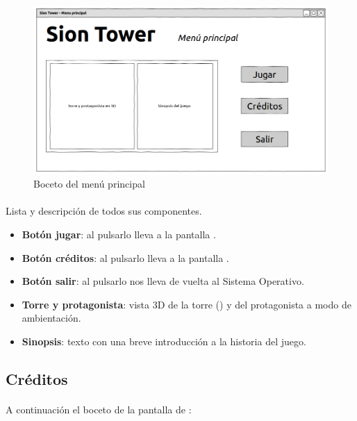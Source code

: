 \begin{figure}[H]
    \centering
        \includegraphics[width=\textwidth]{img/menu-principal.png} 
    \caption{Boceto del menú principal}
    \label{img:menu-principal}
\end{figure}

\paragraph{}
Lista y descripción de todos sus componentes.

\begin{itemize}
    \item \textbf{Botón jugar}: al pulsarlo lleva a la pantalla \selperfil.
    \item \textbf{Botón créditos}: al pulsarlo lleva a la pantalla \creditos.
    \item \textbf{Botón salir}: al pulsarlo nos lleva de vuelta al Sistema Operativo.
    \item \textbf{Torre y protagonista}: vista 3D de la torre (\juego) y del
    protagonista a modo de ambientación.
    \item \textbf{Sinopsis}: texto con una breve introducción a la historia
    del juego.
\end{itemize}

\clearpage

\subsection{Créditos}
\label{sec:ui-creditos}

\paragraph{}
A continuación el boceto de la pantalla de \creditos:

